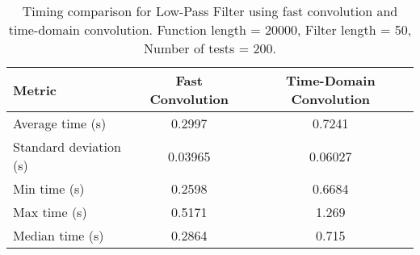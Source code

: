 \begin{table}[h!]
\centering
\begin{tabular}{|l|c|c|}
\hline
\textbf{Metric}       & \textbf{Fast Convolution} & \textbf{Time-Domain Convolution} \\ \hline
Average time (s)      & 0.2997                    & 0.7241                           \\ \hline
Standard deviation (s)& 0.03965                   & 0.06027                          \\ \hline
Min time (s)          & 0.2598                    & 0.6684                           \\ \hline
Max time (s)          & 0.5171                    & 1.269                            \\ \hline
Median time (s)       & 0.2864                    & 0.715                            \\ \hline
\end{tabular}
\caption{Timing comparison for Low-Pass Filter using fast convolution and time-domain convolution. Function length = 20000, Filter length = 50, Number of tests = 200.}
\label{tab:timing_comparison}
\end{table}